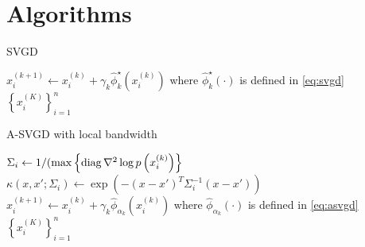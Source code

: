 \section{Algorithms}

\begin{algorithm}[H] 
    \caption{SVGD} \label{alg:SVGD} 
\begin{algorithmic}
        \State $x_{i}^{(k+1)} \leftarrow x_{i}^{(k)}+ \gamma_k \hat{\phi}_k^{\star}\left(x_{i}^{(k)}\right)$ where $\hat{\phi}_k^{\star}(\cdot)$ is defined in \cref{eq:svgd}
        \EndFor
    \EndFor
    \State \Return $\left\{x_i^{(K)}  \right\}_{i = 1}^n$ 
   \EndProcedure 
\end{algorithmic}
\end{algorithm}

\begin{algorithm}[H] 
    \caption{A-SVGD with local bandwidth} \label{alg:ASVGD_bw} 
\begin{algorithmic}
        \State $\Sigma_i \gets 1/(\max \left\{\operatorname{diag} \nabla^2 \log p\left( x_{i}^{(k)}\right) \right\}$
        \State $\kappa(x, x'; \Sigma_i)\gets \exp(-(x - x')^T \Sigma_i^{-1}(x- x')  )$
        \State $x_{i}^{(k+1)} \leftarrow x_{i}^{(k)}+ \gamma_k \hat{\phi}_{\alpha_k}\left(x_{i}^{(k)}\right)$ where $\hat{\phi}_{\alpha_k}(\cdot)$ is defined in \cref{eq:asvgd}
        \EndFor
    \EndFor
    \State \Return $\left\{x_i^{(K)}  \right\}_{i = 1}^n$ 
   \EndProcedure 
\end{algorithmic}
\end{algorithm}




